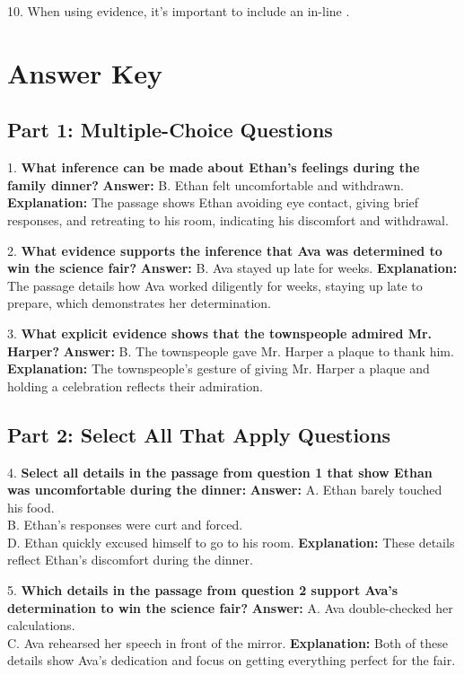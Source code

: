 \documentclass[12pt]{article}
\begin{document}
10. When using evidence, it's important to include an in-line \underline{\hspace{4cm}} . 
\vspace{2cm}
\newpage
\section*{Answer Key}

\subsection*{Part 1: Multiple-Choice Questions}

1. \textbf{What inference can be made about Ethan's feelings during the family dinner?}  
\textbf{Answer:} B. Ethan felt uncomfortable and withdrawn.  
\textbf{Explanation:} The passage shows Ethan avoiding eye contact, giving brief responses, and retreating to his room, indicating his discomfort and withdrawal.

\vspace{1cm}
2. \textbf{What evidence supports the inference that Ava was determined to win the science fair?}  
\textbf{Answer:} B. Ava stayed up late for weeks.  
\textbf{Explanation:} The passage details how Ava worked diligently for weeks, staying up late to prepare, which demonstrates her determination.

\vspace{1cm}
3. \textbf{What explicit evidence shows that the townspeople admired Mr. Harper?}  
\textbf{Answer:} B. The townspeople gave Mr. Harper a plaque to thank him.  
\textbf{Explanation:} The townspeople's gesture of giving Mr. Harper a plaque and holding a celebration reflects their admiration.

\subsection*{Part 2: Select All That Apply Questions}

4. \textbf{Select all details in the passage from question 1 that show Ethan was uncomfortable during the dinner:}  
\textbf{Answer:} A. Ethan barely touched his food. \\
B. Ethan’s responses were curt and forced. \\
D. Ethan quickly excused himself to go to his room.  
\textbf{Explanation:} These details reflect Ethan's discomfort during the dinner.

\vspace{1cm}
5. \textbf{Which details in the passage from question 2 support Ava’s determination to win the science fair?}  
\textbf{Answer:} A. Ava double-checked her calculations. \\
C. Ava rehearsed her speech in front of the mirror.  
\textbf{Explanation:} Both of these details show Ava's dedication and focus on getting everything perfect for the fair.
\end{document}
